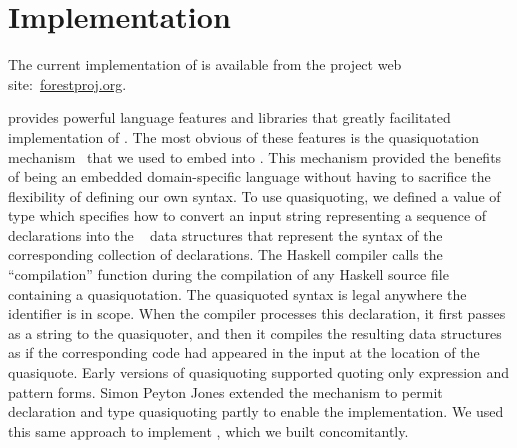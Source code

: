 \section{Implementation}
\label{sec:implementation}

The current implementation of \forest{} is available from the project web
site:~\url{forestproj.org}. 

\haskell{} provides powerful language features and libraries that
greatly facilitated implementation of \forest{}.  The most obvious
of these features is the quasiquotation mechanism~\cite{Mainland:quasi}
that we used to embed \forest{} into \haskell{}.  This mechanism
provided the benefits of being an embedded domain-specific
language without having to sacrifice the flexibility of
defining our own syntax. To use quasiquoting, we defined a \haskell{}
value  of type  which specifies how to
convert an input string representing a sequence of \forest{} declarations into the
\template{}~\cite{Sheard+:templatehaskell} 
data structures that represent the syntax of the
corresponding collection of \haskell{} declarations.
The Haskell compiler calls the  ``compilation'' function 
during the compilation of any Haskell source file containing a \forest{} quasiquotation.
The quasiquoted syntax 
is legal anywhere the identifier  is in scope.
When the \haskell{} compiler processes this declaration, it first
passes  as a string to the  quasiquoter, and
then it compiles the resulting \template{} data structures as if the
corresponding \haskell{} code had appeared in the input at the
location of the quasiquote.  Early versions of quasiquoting
supported quoting only expression and pattern forms.  Simon Peyton
Jones extended the mechanism to permit declaration and type
quasiquoting partly to enable the \forest{} implementation.  We used
this same approach to implement \padshaskell{}, which we built
concomitantly.  

